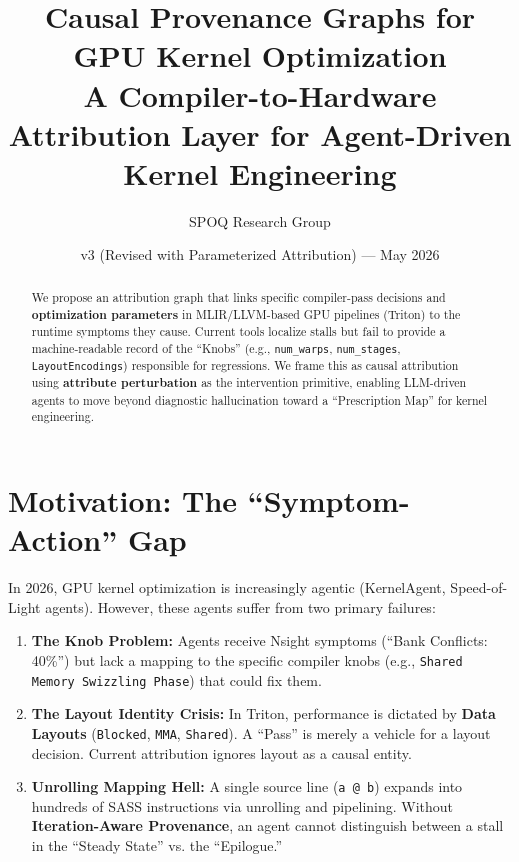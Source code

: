 \documentclass[11pt,a4paper]{article}
\title{\textbf{Causal Provenance Graphs for GPU Kernel Optimization} \\ \large A Compiler-to-Hardware Attribution Layer for Agent-Driven Kernel Engineering}
\author{SPOQ Research Group}
\date{v3 (Revised with Parameterized Attribution) --- May 2026}
\begin{document}
\maketitle

\begin{abstract}
We propose an attribution graph that links specific compiler-pass decisions and \textbf{optimization parameters} in MLIR/LLVM-based GPU pipelines (Triton) to the runtime symptoms they cause. Current tools localize stalls but fail to provide a machine-readable record of the ``Knobs'' (e.g., \texttt{num\_warps}, \texttt{num\_stages}, \texttt{LayoutEncodings}) responsible for regressions. We frame this as causal attribution using \textbf{attribute perturbation} as the intervention primitive, enabling LLM-driven agents to move beyond diagnostic hallucination toward a ``Prescription Map'' for kernel engineering.
\end{abstract}

\section{Motivation: The ``Symptom-Action'' Gap}
In 2026, GPU kernel optimization is increasingly agentic (KernelAgent, Speed-of-Light agents). However, these agents suffer from two primary failures:
\begin{enumerate}
    \item \textbf{The Knob Problem:} Agents receive Nsight symptoms (``Bank Conflicts: 40\%'') but lack a mapping to the specific compiler knobs (e.g., \texttt{Shared Memory Swizzling Phase}) that could fix them.
    \item \textbf{The Layout Identity Crisis:} In Triton, performance is dictated by \textbf{Data Layouts} (\texttt{Blocked}, \texttt{MMA}, \texttt{Shared}). A ``Pass'' is merely a vehicle for a layout decision. Current attribution ignores layout as a causal entity.
    \item \textbf{Unrolling Mapping Hell:} A single source line (\texttt{a @ b}) expands into hundreds of SASS instructions via unrolling and pipelining. Without \textbf{Iteration-Aware Provenance}, an agent cannot distinguish between a stall in the ``Steady State'' vs. the ``Epilogue.''
\end{enumerate}
\end{document}
